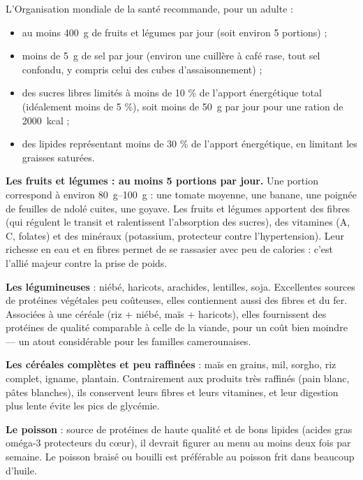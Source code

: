 \documentclass[11pt]{article}
\newcommand{\cle}[1]{{\popxbold\color{popdark}#1}}
\newcounter{popsec}
\newcounter{popsub}
\newcommand{\courssub}[1]{%
  \stepcounter{popsub}%
  \par\vspace{9pt}\noindent{\popxbold\fontsize{11.5}{13}\selectfont\color{popink}{\color{poporange}\thepopsec.\thepopsub}\hspace{6pt}#1}\par\nopagebreak\vspace{4pt}
}
\begin{document}
\begin{propriete}
L'Organisation mondiale de la santé recommande, pour un adulte :
\begin{itemize}
\item au moins \cle{\SI{400}{\gram} de fruits et légumes par jour} (soit environ 5 portions) ;
\item moins de \cle{\SI{5}{\gram} de sel par jour} (environ une cuillère à café rase, tout sel confondu, y compris celui des cubes d'assaisonnement) ;
\item des \cle{sucres libres} limités à moins de \cle{10 \% de l'apport énergétique total} (idéalement moins de 5 \%), soit moins de \SI{50}{\gram} par jour pour une ration de \SI{2000}{kcal} ;
\item des lipides représentant moins de 30 \% de l'apport énergétique, en limitant les graisses saturées.
\end{itemize}
\end{propriete}

\courssub{Que faut-il augmenter ?}

\textbf{Les fruits et légumes : au moins 5 portions par jour.} Une portion correspond à environ \SI{80}{\gram}–\SI{100}{\gram} : une tomate moyenne, une banane, une poignée de feuilles de ndolé cuites, une goyave. Les fruits et légumes apportent des fibres (qui régulent le transit et ralentissent l'absorption des sucres), des vitamines (A, C, folates) et des minéraux (potassium, protecteur contre l'hypertension). Leur richesse en eau et en fibres permet de se rassasier avec peu de calories : c'est l'allié majeur contre la prise de poids.

\textbf{Les légumineuses} : niébé, haricots, arachides, lentilles, soja. Excellentes sources de protéines végétales peu coûteuses, elles contiennent aussi des fibres et du fer. Associées à une céréale (riz + niébé, maïs + haricots), elles fournissent des protéines de qualité comparable à celle de la viande, pour un coût bien moindre — un atout considérable pour les familles camerounaises.

\textbf{Les céréales complètes et peu raffinées} : maïs en grains, mil, sorgho, riz complet, igname, plantain. Contrairement aux produits très raffinés (pain blanc, pâtes blanches), ils conservent leurs fibres et leurs vitamines, et leur digestion plus lente évite les pics de glycémie.

\textbf{Le poisson} : source de protéines de haute qualité et de bons lipides (acides gras oméga-3 protecteurs du cœur), il devrait figurer au menu au moins deux fois par semaine. Le poisson braisé ou bouilli est préférable au poisson frit dans beaucoup d'huile.
\end{document}
